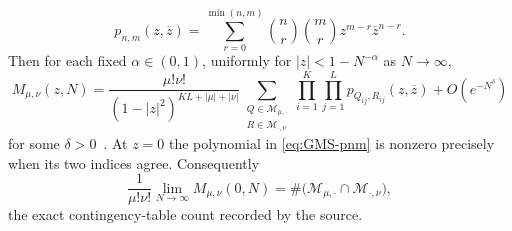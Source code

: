 \begin{equation}
 p_{n,m}(z,\overline z)
 =\sum_{r=0}^{\min(n,m)}\binom nr\binom mr z^{m-r}\overline z^{n-r}.
 \label{eq:GMS-pnm}
\end{equation}
Then for each fixed $\alpha\in(0,1)$, uniformly for
$|z|<1-N^{-\alpha}$ as $N\to\infty$,
\begin{equation}
 M_{\mu,\nu}(z,N)
 =\frac{\mu!\nu!}{(1-|z|^2)^{KL+|\mu|+|\nu|}}
 \sum_{\substack{Q\in\mathcal M_{\mu,\cdot}\\R\in\mathcal M_{\cdot,\nu}}}
 \prod_{i=1}^{K}\prod_{j=1}^{L}
 p_{Q_{ij},R_{ij}}(z,\overline z)
 +O\!\left(e^{-N^\delta}\right)
 \label{eq:GMS-mesoscopic}
\end{equation}
for some $\delta>0$~\cite[Thm.~1.1]{groverMezzadriSimm2026}.  At $z=0$ the polynomial
in \eqref{eq:GMS-pnm} is nonzero precisely when its two indices agree.  Consequently
\begin{equation}
 \frac{1}{\mu!\nu!}\lim_{N\to\infty}M_{\mu,\nu}(0,N)
 =\#\bigl(\mathcal M_{\mu,\cdot}\cap\mathcal M_{\cdot,\nu}\bigr),
 \label{eq:GMS-magic-square-limit}
\end{equation}
the exact contingency-table count recorded by the source.

